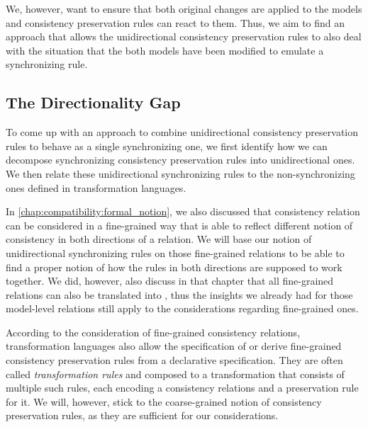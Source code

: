 We, however, want to ensure that both original changes are applied to the models and consistency preservation rules can react to them.
Thus, we aim to find an approach that allows the unidirectional consistency preservation rules to also deal with the situation that the both models have been modified to emulate a synchronizing rule.


\subsection{The Directionality Gap}

To come up with an approach to combine unidirectional consistency preservation rules to behave as a single synchronizing one, we first identify how we can decompose synchronizing consistency preservation rules into unidirectional ones.
We then relate these unidirectional synchronizing rules to the non-synchronizing ones defined in transformation languages.

In \autoref{chap:compatibility:formal_notion}, we also discussed that consistency relation can be considered in a fine-grained way that is able to reflect different notion of consistency in both directions of a relation.
We will base our notion of unidirectional synchronizing rules on those fine-grained relations to be able to find a proper notion of how the rules in both directions are supposed to work together.
We did, however, also discuss in that chapter that all fine-grained relations can also be translated into \modellevelconsistencyrelations, thus the insights we already had for those model-level relations still apply to the considerations regarding fine-grained ones.

According to the consideration of fine-grained consistency relations, transformation languages also allow the specification of or derive fine-grained consistency preservation rules from a declarative specification.
They are often called \emph{transformation rules} and composed to a transformation that consists of multiple such rules, each encoding a consistency relations and a preservation rule for it.
We will, however, stick to the coarse-grained notion of consistency preservation rules, as they are sufficient for our considerations.

